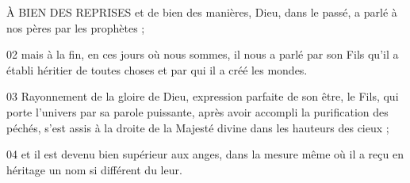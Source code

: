 À BIEN DES REPRISES et de bien des manières, Dieu, dans le passé, a parlé à nos pères par les prophètes ;

02 mais à la fin, en ces jours où nous sommes, il nous a parlé par son Fils qu’il a établi héritier de toutes choses et par qui il a créé les mondes.

03 Rayonnement de la gloire de Dieu, expression parfaite de son être, le Fils, qui porte l’univers par sa parole puissante, après avoir accompli la purification des péchés, s’est assis à la droite de la Majesté divine dans les hauteurs des cieux ;

04 et il est devenu bien supérieur aux anges, dans la mesure même où il a reçu en héritage un nom si différent du leur.
